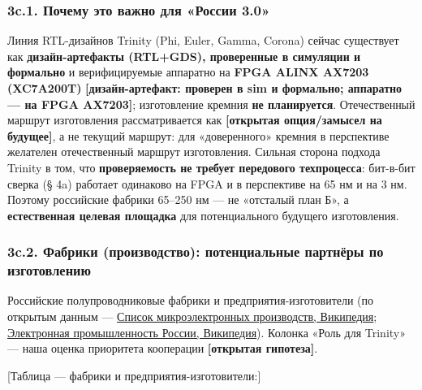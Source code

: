\documentclass[
  russian,
]{article}
\begin{document}
\subsubsection{3c.1. Почему это важно для «России
3.0»}\label{c.1.-ux43fux43eux447ux435ux43cux443-ux44dux442ux43e-ux432ux430ux436ux43dux43e-ux434ux43bux44f-ux440ux43eux441ux441ux438ux438-3.0}

Линия RTL-дизайнов Trinity (Phi, Euler, Gamma, Corona) сейчас существует
как \textbf{дизайн-артефакты (RTL+GDS), проверенные в симуляции и формально}
и верифицируемые аппаратно на \textbf{FPGA ALINX AX7203 (XC7A200T)}
\textbf{{[}дизайн-артефакт: проверен в sim и формально; аппаратно --- на FPGA AX7203{]}};
изготовление кремния \textbf{не планируется}. Отечественный маршрут изготовления
рассматривается как \textbf{{[}открытая опция/замысел на будущее{]}}, а не текущий
маршрут: для «доверенного» кремния в перспективе желателен отечественный маршрут
изготовления. Сильная сторона подхода Trinity в том, что \textbf{проверяемость не
требует передового техпроцесса}: бит-в-бит сверка (§ 4a) работает одинаково на
FPGA и в перспективе на 65 нм и на 3 нм. Поэтому российские фабрики 65--250 нм ---
не «отсталый план Б», а \textbf{естественная целевая площадка} для потенциального
будущего изготовления.

\subsubsection{3c.2. Фабрики (производство): потенциальные партнёры по
изготовлению}\label{c.2.-ux444ux430ux431ux440ux438ux43aux438-ux43fux440ux43eux438ux437ux432ux43eux434ux441ux442ux432ux43e-ux43fux43eux442ux435ux43dux446ux438ux430ux43bux44cux43dux44bux435-ux43fux430ux440ux442ux43dux451ux440ux44b-ux43fux43e-ux438ux437ux433ux43eux442ux43eux432ux43bux435ux43dux438ux44e}

Российские полупроводниковые фабрики и предприятия-изготовители (по
открытым данным ---
\href{https://ru.wikipedia.org/wiki/Список_микроэлектронных_производств}{Список
микроэлектронных производств, Википедия};
\href{https://ru.wikipedia.org/wiki/Электронная_промышленность_России}{Электронная
промышленность России, Википедия}). Колонка «Роль для Trinity» --- наша
оценка приоритета кооперации \textbf{{[}открытая гипотеза{]}}.

{[}Таблица --- фабрики и предприятия-изготовители:{]}
\end{document}
